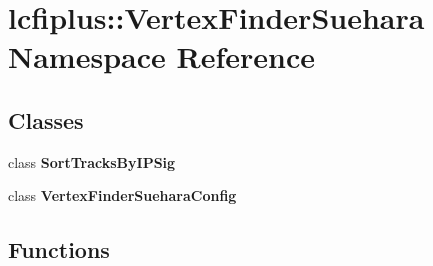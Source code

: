 \section{lcfiplus\-:\-:Vertex\-Finder\-Suehara Namespace Reference}
\label{namespacelcfiplus_1_1VertexFinderSuehara}
\subsection*{Classes}
\begin{DoxyCompactItemize}
\item 
class {\bf Sort\-Tracks\-By\-I\-P\-Sig}
\item 
class {\bf Vertex\-Finder\-Suehara\-Config}
\end{DoxyCompactItemize}
\subsection*{Functions}
